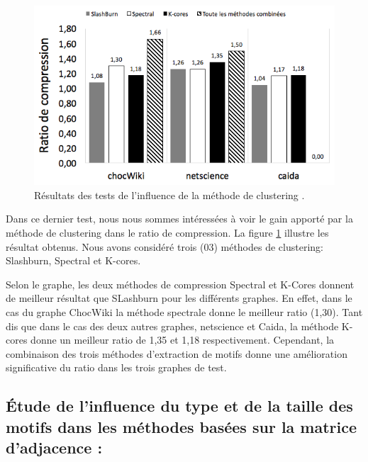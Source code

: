 		\begin{figure}[H]
			\centering
			
			\includegraphics[scale=0.7]{ressources/image/clustmthd.png}
			
			\caption{Résultats des tests de l'influence de la méthode de clustering .}
			\label{fig:test-clustmtd}
	
	\end{figure}	
		
	
	Dans ce dernier test, nous nous sommes intéressées à voir le gain apporté par la méthode de clustering dans le ratio de compression. La figure \ref{fig:test-clustmtd} illustre les résultat obtenus. Nous avons considéré trois (03) méthodes de clustering: Slashburn, Spectral et K-cores. 
	
	Selon le graphe, les deux méthodes de compression Spectral et K-Cores donnent de meilleur résultat que SLashburn pour les différents graphes. En effet, dans le cas du graphe ChocWiki la méthode spectrale donne le meilleur ratio (1,30). Tant dis que dans le cas des deux autres graphes, netscience et Caida, la méthode K-cores donne un meilleur ratio de 1,35 et 1,18 respectivement. Cependant, la combinaison des trois méthodes d'extraction de motifs donne une amélioration significative du ratio dans les trois graphes de test.
	
	
	
	
	\subsection{Étude de l'influence du type et de la taille des motifs dans les méthodes basées sur la matrice d'adjacence :}
	
